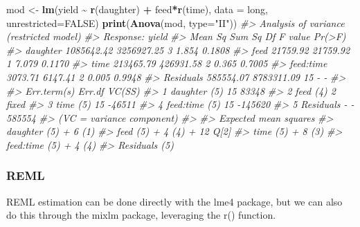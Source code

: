 \documentclass[
]{article}
\newenvironment{Shaded}{\begin{snugshade}}{\end{snugshade}}
\newcommand{\AttributeTok}[1]{\textcolor[rgb]{0.13,0.29,0.53}{#1}}
\newcommand{\CommentTok}[1]{\textcolor[rgb]{0.56,0.35,0.01}{\textit{#1}}}
\newcommand{\ConstantTok}[1]{\textcolor[rgb]{0.56,0.35,0.01}{#1}}
\newcommand{\FunctionTok}[1]{\textcolor[rgb]{0.13,0.29,0.53}{\textbf{#1}}}
\newcommand{\NormalTok}[1]{#1}
\newcommand{\OtherTok}[1]{\textcolor[rgb]{0.56,0.35,0.01}{#1}}
\newcommand{\SpecialCharTok}[1]{\textcolor[rgb]{0.81,0.36,0.00}{\textbf{#1}}}
\newcommand{\StringTok}[1]{\textcolor[rgb]{0.31,0.60,0.02}{#1}}
\begin{document}
\begin{Shaded}
\begin{Highlighting}[]
\NormalTok{mod }\OtherTok{\textless{}{-}} \FunctionTok{lm}\NormalTok{(yield }\SpecialCharTok{\textasciitilde{}} \FunctionTok{r}\NormalTok{(daughter) }\SpecialCharTok{+}\NormalTok{ feed}\SpecialCharTok{*}\FunctionTok{r}\NormalTok{(time), }\AttributeTok{data =}\NormalTok{ long, }\AttributeTok{unrestricted=}\ConstantTok{FALSE}\NormalTok{)}
\FunctionTok{print}\NormalTok{(}\FunctionTok{Anova}\NormalTok{(mod, }\AttributeTok{type=}\StringTok{"II"}\NormalTok{))}
\CommentTok{\#\textgreater{} Analysis of variance (restricted model)}
\CommentTok{\#\textgreater{} Response: yield}
\CommentTok{\#\textgreater{}              Mean Sq     Sum Sq Df F value Pr(\textgreater{}F)}
\CommentTok{\#\textgreater{} daughter  1085642.42 3256927.25  3   1.854 0.1808}
\CommentTok{\#\textgreater{} feed        21759.92   21759.92  1   7.079 0.1170}
\CommentTok{\#\textgreater{} time       213465.79  426931.58  2   0.365 0.7005}
\CommentTok{\#\textgreater{} feed:time    3073.71    6147.41  2   0.005 0.9948}
\CommentTok{\#\textgreater{} Residuals  585554.07 8783311.09 15       {-}      {-}}
\CommentTok{\#\textgreater{} }
\CommentTok{\#\textgreater{}             Err.term(s) Err.df  VC(SS)}
\CommentTok{\#\textgreater{} 1 daughter          (5)     15   83348}
\CommentTok{\#\textgreater{} 2 feed              (4)      2   fixed}
\CommentTok{\#\textgreater{} 3 time              (5)     15  {-}46511}
\CommentTok{\#\textgreater{} 4 feed:time         (5)     15 {-}145620}
\CommentTok{\#\textgreater{} 5 Residuals           {-}      {-}  585554}
\CommentTok{\#\textgreater{} (VC = variance component)}
\CommentTok{\#\textgreater{} }
\CommentTok{\#\textgreater{}           Expected mean squares}
\CommentTok{\#\textgreater{} daughter  (5) + 6 (1)          }
\CommentTok{\#\textgreater{} feed      (5) + 4 (4) + 12 Q[2]}
\CommentTok{\#\textgreater{} time      (5) + 8 (3)          }
\CommentTok{\#\textgreater{} feed:time (5) + 4 (4)          }
\CommentTok{\#\textgreater{} Residuals (5)}
\end{Highlighting}
\end{Shaded}

\subsubsection{REML}\label{reml}

REML estimation can be done directly with the lme4 package, but we can
also do this through the mixlm package, leveraging the r() function.
\end{document}
